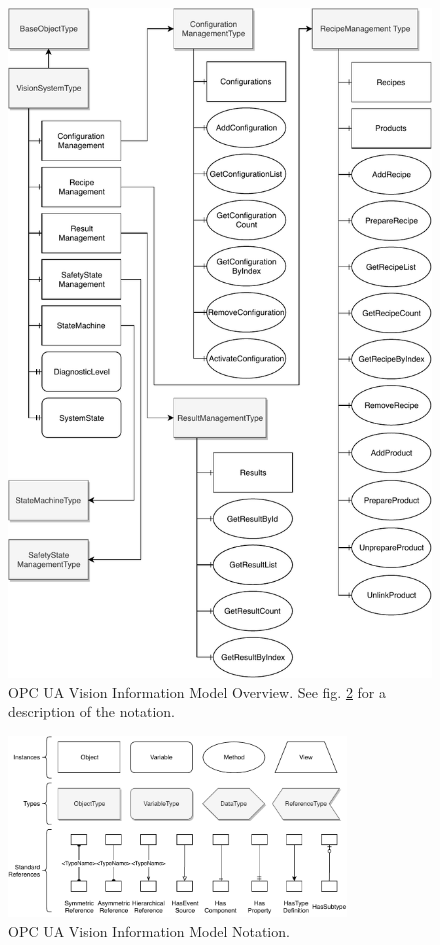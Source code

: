 \begin{figure}
    \centering
    \includegraphics[height=0.9\textheight]{img/OPCUAVisionInformationModelOverview.pdf}
    \caption[OPC UA Vision Information Model Overview]{OPC UA Vision Information Model Overview. See fig. \ref{fig:OPCInfoModelNotation} for a description of the notation.~\cite{VDMA2018OPCSpecification}}
    \label{fig:OPCInfoModelOverview}
\end{figure}

\begin{figure}[ht]
    \centering
    \includegraphics[width=0.8\textwidth]{img/OPCUAVisionInformationModelNotation.pdf}
    \caption[OPC UA Vision Information Model Notation]{OPC UA Vision Information Model Notation.\cite{VDMA2018OPCSpecification}}
    \label{fig:OPCInfoModelNotation}
\end{figure}

